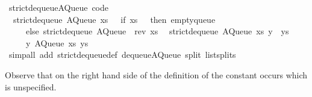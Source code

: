 \begin{isabellebody}
\isanewline
{}\isamarkupfalse%
\ strict{\isacharunderscore}dequeue{\isacharprime}{\isacharunderscore}AQueue\ {\isacharbrackleft}code{\isacharbrackright}{\isacharcolon}\isanewline
\ \ {\isachardoublequoteopen}strict{\isacharunderscore}dequeue{\isacharprime}\ {\isacharparenleft}AQueue\ xs\ {\isacharbrackleft}{\isacharbrackright}{\isacharparenright}\ {\isacharequal}\ {\isacharparenleft}if\ xs\ {\isacharequal}\ {\isacharbrackleft}{\isacharbrackright}\ then\ empty{\isacharunderscore}queue\isanewline
\ \ \ \ \ else\ strict{\isacharunderscore}dequeue{\isacharprime}\ {\isacharparenleft}AQueue\ {\isacharbrackleft}{\isacharbrackright}\ {\isacharparenleft}rev\ xs{\isacharparenright}{\isacharparenright}{\isacharparenright}{\isachardoublequoteclose}\isanewline
\ \ {\isachardoublequoteopen}strict{\isacharunderscore}dequeue{\isacharprime}\ {\isacharparenleft}AQueue\ xs\ {\isacharparenleft}y\ {\isacharhash}\ ys{\isacharparenright}{\isacharparenright}\ {\isacharequal}\isanewline
\ \ \ \ \ {\isacharparenleft}y{\isacharcomma}\ AQueue\ xs\ ys{\isacharparenright}{\isachardoublequoteclose}\isanewline
\ \ \isamarkupfalse%
\ {\isacharparenleft}simp{\isacharunderscore}all\ add{\isacharcolon}\ strict{\isacharunderscore}dequeue{\isacharprime}{\isacharunderscore}def\ dequeue{\isacharunderscore}AQueue\ split{\isacharcolon}\ list{\isachardot}splits{\isacharparenright}%
\endisatagquote
{\isafoldquote}%
%
\isadelimquote
%
\endisadelimquote
%
\begin{isamarkuptext}%
Observe that on the right hand side of the definition of  the constant  occurs
  which is unspecified.


\end{isamarkuptext}
\end{isabellebody}
